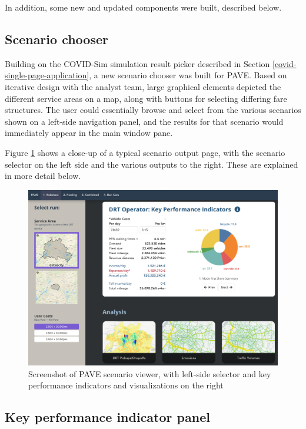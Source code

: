 In addition, some new and updated components were built, described below.

\subsection{Scenario chooser}
\label{pave-scenario-chooser}

Building on the COVID-Sim simulation result picker described in Section \ref{covid-single-page-application}, a new scenario chooser was built for PAVE. Based on iterative design with the analyst team, large graphical elements depicted the different service areas on a map, along with buttons for selecting differing fare structures. The user could essentially browse and select from the various scenarios shown on a left-side navigation panel, and the results for that scenario would immediately appear in the main window pane.

Figure \ref{fig:pave-scenario-chooser} shows a close-up of a typical scenario output page, with the scenario selector on the left side and the various outputs to the right. These are explained in more detail below.

\begin{figure}[ht]
  \centering
  \includegraphics[width=0.95\linewidth]{chapters/23-pave/images/fig-kpi-panel.png}
  \caption{Screenshot of PAVE scenario viewer, with left-side selector and key performance indicators and visualizations on the right}
  \label{fig:pave-scenario-chooser}
\end{figure}

\subsection{Key performance indicator panel}
\label{pave-kpi-panel}

